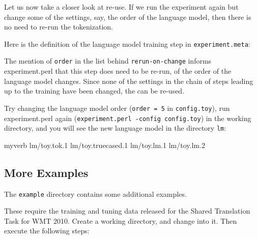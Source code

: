 Let us now take a closer look at re-use. If we run the experiment again but change some of the settings, say, the order of the language model, then there is no need to re-run the tokenization. 



Here is the definition of the language model training step in {\tt experiment.meta}:






\colorbox{gray}{%
}

The mention of {\tt order} in the list behind {\tt rerun-on-change} informs experiment.perl that this step does need to be re-run, of the order of the language model changes. Since none of the settings in the chain of steps leading up to the training have been changed, the can be re-used.



Try changing the language model order ({\tt order = 5} in {\tt config.toy}), run experiment.perl again ({\tt experiment.perl -config config.toy}) in the working directory, and you will see the new language model in the directory {\tt lm}:






\begin{SaveVerbatim}{myverb}
 lm/toy.tok.1
 lm/toy.truecased.1
 lm/toy.lm.1
 lm/toy.lm.2
\end{SaveVerbatim}
\colorbox{gray}{%
}

\subsection{
\label{experiment-perl.texntoc4}More Examples}


The {\tt example} directory contains some additional examples. 



These require the training and tuning data released for the Shared Translation Task for WMT 2010.
Create a working directory, and change into it. Then execute the following steps:







